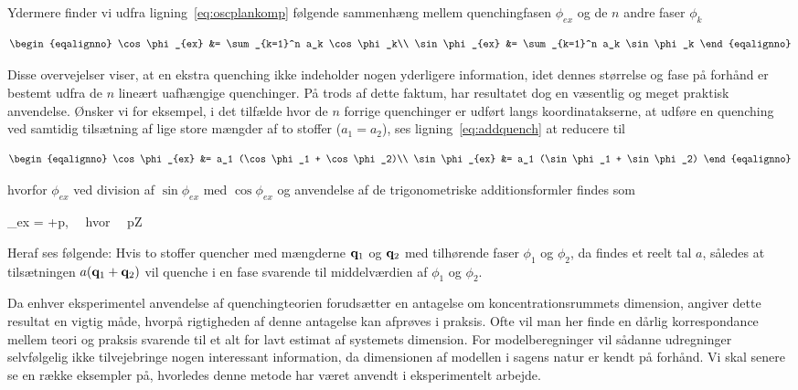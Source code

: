 Ydermere finder vi udfra lig\-ning~\ref{eq:oscplankomp} f{\o}lgende
sammenh{\ae}ng mellem quenching\-fasen $\phi_{ex}$ og de $n$ andre
faser $\phi_k$

\begin{subequations}
 \begin{eqalignno}
  \cos\phi_{ex} &= \sum_{k=1}^n a_k \cos\phi_k\\
  \sin\phi_{ex} &= \sum_{k=1}^n a_k \sin\phi_k
 \end{eqalignno}
 \label{eq:addquench}
\end{subequations}

Disse overvejelser viser, at en ekstra quenching ikke
indeholder nogen yderligere information, idet dennes
st{\o}rrelse og fase p{\aa} forh{\aa}nd er bestemt udfra de
$n$ line{\ae}rt uafh{\ae}ngige quenchinger. P{\aa} trods af
dette faktum, har resultatet dog en v{\ae}sentlig og meget
praktisk anvendelse. {\O}nsker vi for eksempel, i det
tilf{\ae}lde hvor de $n$ forrige quenchinger er udf{\o}rt
langs koordinatakserne, at udf{\o}re en quenching ved
samtidig tils{\ae}tning af lige store m{\ae}ngder af to
stoffer ($a_1=a_2$), ses lig\-ning~\ref{eq:addquench} at
reducere til

\begin{subequations}
 \begin{eqalignno}
  \cos\phi_{ex} &= a_1 (\cos\phi_1 + \cos\phi_2)\\
  \sin\phi_{ex} &= a_1 (\sin\phi_1 + \sin\phi_2)
 \end{eqalignno}
\end{subequations}

hvorfor $\phi_{ex}$ ved division af $\sin\phi_{ex}$ med
$\cos\phi_{ex}$ og anvendelse af de tri\-go\-no\-me\-triske
additionsformler findes som

\begin{eqalignno}
 \phi_{ex} = +p\pi, 
 \mbox{\ \ hvor\ \ } p\in \mbox{\Bb Z}
\end{eqalignno}

Heraf ses f{\o}lgende: Hvis to stoffer quencher med
m{\ae}ngderne ${\bf q}_1$ og ${\bf q}_2$ med tilh{\o}rende
faser $\phi_1$ og $\phi_2$, da findes et reelt tal $a$,
s{\aa}ledes at tils{\ae}tningen $a({\bf q}_1+{\bf q}_2)$
vil quenche i en fase svarende til middelv{\ae}rdien af
$\phi_1$ og $\phi_2$.

\vspace{4.0mm}
Da enhver eksperi\-mentel anvendelse af quenchingteorien
foruds{\ae}tter en antag\-else om koncentrationsrummets
dimension, angiver dette resultat en vigtig m{\aa}de,
hvorp{\aa} rigtigheden af denne antagelse kan afpr{\o}ves i
praksis. Ofte vil man her finde en d{\aa}rlig
korrespondance mellem teori og praksis svarende til et alt
for lavt esti\-mat af systemets dimension. For
model\-beregninger vil s{\aa}danne udregninger
selvf{\o}lgelig ikke tilvejebringe nogen interessant
information, da dimensionen af model\-len i sagens natur er
kendt p{\aa} forh{\aa}nd. Vi skal senere se en r{\ae}kke
eksempler p{\aa}, hvorledes denne metode har v{\ae}ret
anvendt i eksperimentelt arbejde.

